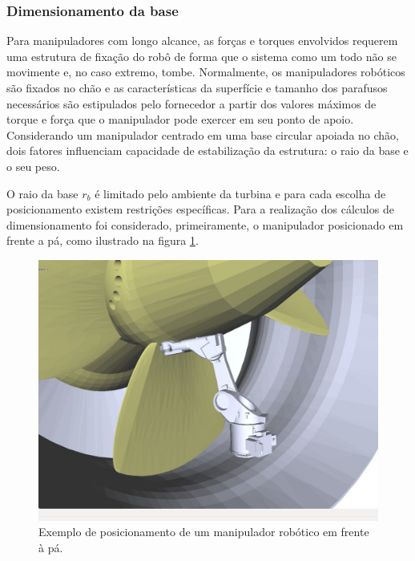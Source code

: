 \subsubsection{Dimensionamento da base}

Para manipuladores com longo alcance, as forças e torques envolvidos requerem
uma estrutura de fixação do robô de forma que o sistema como um todo não se
movimente e, no caso extremo, tombe. Normalmente, os manipuladores robóticos são
fixados no chão e as características da superfície e tamanho dos parafusos
necessários são estipulados pelo fornecedor a partir dos valores máximos de
torque e força que o manipulador pode exercer em seu ponto de apoio.
Considerando um manipulador centrado em uma base circular apoiada no chão, dois
fatores influenciam capacidade de estabilização da estrutura: o raio da base e o seu peso.

O raio da base $r_{b}$ é limitado pelo ambiente da turbina e para cada escolha
de posicionamento existem restrições específicas. 
Para a realização dos cálculos de dimensionamento foi considerado,
primeiramente, o manipulador posicionado em frente a pá, como ilustrado na
figura \ref{fig::robot_front}.

\begin{figure}[h!]
\centering
	\includegraphics[width=\columnwidth]{sota/figs/openrave/robot_front_openrave.jpg}
	\caption{Exemplo de posicionamento de um manipulador robótico em frente à pá.}
	\label{fig::robot_front}
\end{figure}

